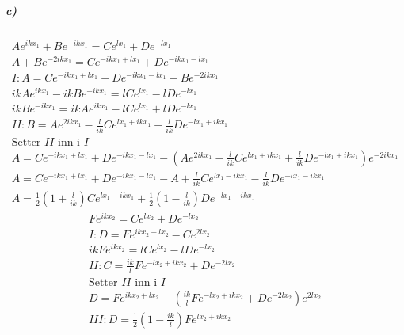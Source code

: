 \documentclass[11pt, A4paper,norsk]{article}
\begin{document}
			\subparagraph{c)}
				\begin{gather*}
A e^{i k x_1} + B e^{- i k x_1} = C e^{l x_1} + D e^{- l x_1} \\
A + B e^{- 2 i k x_1} = C e^{- i k x_1 + l x_1} + D e^{- i k x_1 - l x_1} \\
I : A = C e^{- i k x_1 + l x_1} + D e^{- i k x_1 - l x_1} - B e^{- 2 i k x_1} \\
i k A e^{i k x_1} - i k B e^{- i k x_1} = l C e^{l x_1} - l D e^{- l x_1} \\
i k B e^{- i k x_1} = i k A e^{i k x_1} - l C e^{l x_1} + l D e^{- l x_1} \\
II : B = A e^{2 i k x_1} - \frac{l}{i k} C e^{l x_1 + i k x_1} + \frac{l}{ik} D e^{- l x_1 + i k x_1} \\
\text{Setter $II$ inn i $I$} \\
A = C e^{- i k x_1 + l x_1} + D e^{- i k x_1 - l x_1} - \left( A e^{2 i k x_1} - \frac{l}{i k} C e^{l x_1 + i k x_1} + \frac{l}{ik} D e^{- l x_1 + i k x_1} \right) e^{- 2 i k x_1} \\
A = C e^{- i k x_1 + l x_1} + D e^{- i k x_1 - l x_1} - A + \frac{l}{i k} C e^{l x_1 - i k x_1} - \frac{l}{ik} D e^{- l x_1 - i k x_1} \\
A = \frac{1}{2} \left( 1 + \frac{l}{ik} \right) C e^{l x_1 - i k x_1} + \frac{1}{2} \left( 1 - \frac{l}{ik} \right) D e^{- l x_1 - i k x_1}
				\end{gather*}
				\begin{gather*}
F e^{i k x_2} = C e^{l x_2} + D e^{- l x_2} \\
I : D = F e^{i k x_2 + l x_2} - C e^{2 l x_2} \\
i k F e^{i k x_2} = l C e^{l x_2} - l D e^{- l x_2} \\
II : C = \frac{i k}{l} F e^{- l x_2 + i k x_2} + D e^{- 2 l x_2} \\
\text{Setter $II$ inn i $I$} \\
D = F e^{i k x_2 + l x_2} - \left( \frac{i k}{l} F e^{- l x_2 + i k x_2} + D e^{- 2 l x_2} \right) e^{2 l x_2} \\
III : D = \frac{1}{2} \left( 1 - \frac{i k}{l} \right) F e^{l x_2 + i k x_2}
				\end{gather*}
\end{document}

